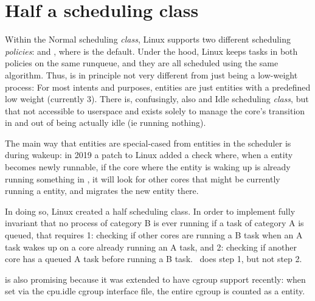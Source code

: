 
\section{Half a scheduling class}
\label{sec:sched-idle}

Within the Normal scheduling \textit{class}, Linux supports two different
scheduling \textit{policies}: \schednormal{} and \schedidle{}, where
\schednormal{} is the default. Under the hood, Linux keeps tasks in both
policies on the same runqueue, and they are all scheduled using the same
algorithm. Thus, \schedidle{} is in principle not very different from just being
a low-weight process: For most intents and purposes, \schedidle{} entities are
just entities with a predefined low weight (currently 3). There is, confusingly,
also and Idle scheduling \textit{class}, but that not accessible to userspace
and exists solely to manage the core's transition in and out of being actually
idle (ie running nothing).

The main way that \schedidle{} entities are special-cased from \schednormal{}
entities in the scheduler is during wakeup: in 2019 a patch to Linux added a
check where, when a \schednormal{} entity becomes newly runnable, if the core
where the entity is waking up is already running something in \schednormal{}, it
will look for other cores that might be currently running a \schedidle{} entity,
and migrates the new entity there.

In doing so, Linux created a half scheduling class. In order to implement fully
invariant that no process of category B is ever running if a task of category A
is queued, that requires 1: checking if other cores are running a B task when an
A task wakes up on a core already running an A task, and 2: checking if another
core has a queued A task before running a B task.\ \schedidle{} does step 1, but
not step 2.

\schedidle{} is also promising because it was extended to have cgroup support
recently: when set via the cpu.idle cgroup interface file, the entire cgroup is
counted as a \schedidle{} entity.

